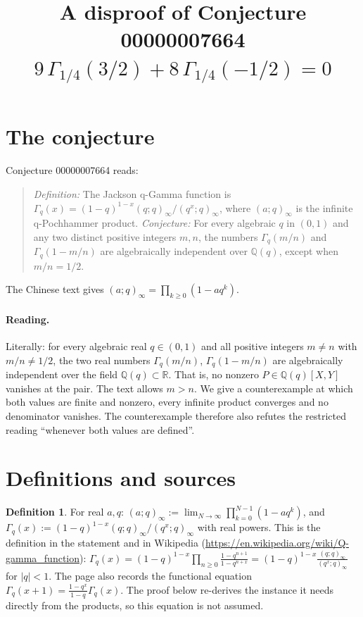 \documentclass[11pt]{article}
\title{A disproof of Conjecture 00000007664\\[2pt]
\large $9\,\Gamma_{1/4}(3/2) + 8\,\Gamma_{1/4}(-1/2) = 0$}
\date{}
\theoremstyle{definition}
\newtheorem{definition}[theorem]{Definition}
\theoremstyle{remark}
\renewcommand{\_}{\oldus\allowbreak}
\begin{document}
\sloppy
\maketitle

\section{The conjecture}

Conjecture 00000007664 reads:

\begin{quote}
\emph{Definition:} The Jackson q-Gamma function is
$\Gamma_q(x)=(1-q)^{1-x}(q;q)_\infty/(q^x;q)_\infty$, where $(a;q)_\infty$ is the infinite
q-Pochhammer product. \emph{Conjecture:} For every algebraic $q$ in $(0,1)$ and any two distinct positive
integers $m, n$, the numbers $\Gamma_q(m/n)$ and $\Gamma_q(1-m/n)$ are algebraically independent over
$\mathbb{Q}(q)$, except when $m/n=1/2$.
\end{quote}
The Chinese text gives $(a;q)_\infty=\prod_{k\ge 0}(1-aq^k)$.

\paragraph{Reading.} Literally: for every algebraic real $q \in (0,1)$ and all positive integers
$m \ne n$ with $m/n \ne 1/2$, the two real numbers $\Gamma_q(m/n)$, $\Gamma_q(1-m/n)$ are algebraically
independent over the field $\mathbb{Q}(q) \subset \mathbb{R}$. That is, no nonzero
$P \in \mathbb{Q}(q)[X,Y]$ vanishes at the pair. The text allows $m > n$. We give a counterexample at
which both values are finite and nonzero, every infinite product converges and no denominator vanishes.
The counterexample therefore also refutes the restricted reading ``whenever both values are defined''.

\section{Definitions and sources}

\begin{definition}
For real $a, q$: $(a;q)_\infty := \lim_{N\to\infty} \prod_{k=0}^{N-1} (1 - a q^k)$, and
$\Gamma_q(x) := (1-q)^{1-x} (q;q)_\infty / (q^x;q)_\infty$ with real powers. This is the definition in the
statement and in Wikipedia (\url{https://en.wikipedia.org/wiki/Q-gamma_function}):
$\Gamma_q(x)=(1-q)^{1-x}\prod_{n\ge0}\frac{1-q^{n+1}}{1-q^{n+x}}=(1-q)^{1-x}\frac{(q;q)_\infty}{(q^x;q)_\infty}$
for $|q|<1$. The page also records the functional equation
$\Gamma_q(x+1)=\frac{1-q^x}{1-q}\Gamma_q(x)$. The proof below re-derives the instance it needs directly
from the products, so this equation is not assumed.
\end{definition}
\end{document}
